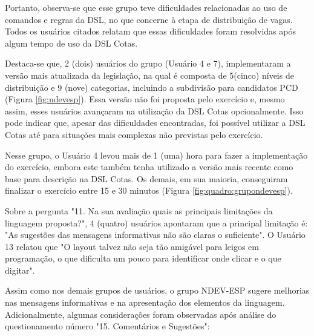 Portanto, observa-se que esse grupo teve dificuldades relacionadas ao uso de comandos e regras da DSL, no que concerne à etapa de distribuição de vagas. Todos os usuários citados relatam que essas dificuldades foram resolvidas após algum tempo de uso da DSL Cotas.

Destaca-se que, 2 (dois) usuários do grupo (Usuário 4 e 7), implementaram a versão mais atualizada da legislação, na qual é composta de 5(cinco) níveis de distribuição e 9 (nove) categorias, incluindo a subdivisão para candidatos PCD (Figura \ref{fig:ndevesp}). Essa versão não foi proposta pelo exercício e, mesmo assim, esses usuários avançaram na utilização da DSL Cotas opcionalmente. Isso pode indicar que, apesar das dificuldades encontradas, foi possível utilizar a DSL Cotas até para situações mais complexas não previstas pelo exercício.




Nesse grupo, o Usuário 4 levou mais de 1 (uma) hora para fazer a implementação do exercício, embora este também tenha utilizado a versão mais recente como base para descrição na DSL Cotas. Os demais, em sua maioria, conseguiram finalizar o exercício entre 15 e 30 minutos (Figura \ref{fig:quadro:grupondevesp}).



Sobre a pergunta "11. Na sua avaliação quais as principais limitações da linguagem proposta?", 4 (quatro) usuários apontaram que a principal limitação é: "As sugestões das mensagens informativas não são claras o suficiente". O Usuário 13 relatou que "O layout talvez não seja tão amigável para leigos em programação, o que dificulta um pouco para identificar onde clicar e o que digitar".

Assim como nos demais grupos de usuários, o grupo NDEV-ESP sugere melhorias nas mensagens informativas e na apresentação dos elementos da linguagem. Adicionalmente, algumas considerações foram observadas após análise do questionamento número "15. Comentários e Sugestões":

